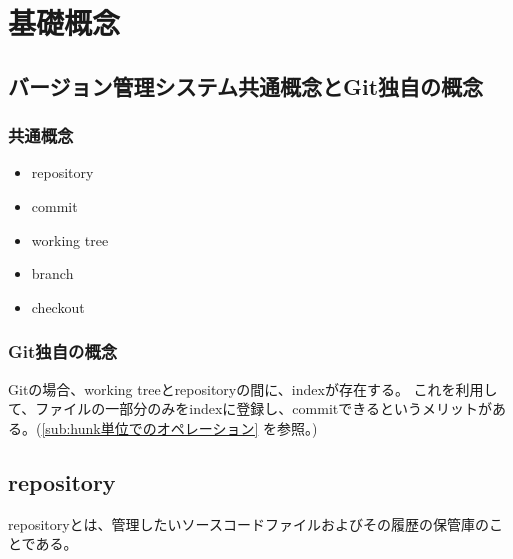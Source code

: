 \documentclass[11pt,a4paper,openany,dvipdfmx]{jsarticle}
\begin{document}
\section{基礎概念} %
\label{sec:基礎概念}


\subsection{バージョン管理システム共通概念とGit独自の概念} %
\label{sub:バージョン管理システム共通概念とGit独自の概念}

\subsubsection{共通概念} %
\label{ssub:共通概念}

\begin{itemize}
  \item repository
  \item commit
  \item working tree
  \item branch
  \item checkout
\end{itemize}

\subsubsection{Git独自の概念} %
\label{ssub:git独自の概念}

Gitの場合、working treeとrepositoryの間に、indexが存在する。
これを利用して、ファイルの一部分のみをindexに登録し、commitできるというメリットがある。(\ref{sub:hunk単位でのオペレーション} を参照。)


\subsection{repository} %
\label{sub:repository}


\begin{tcolorbox}[
title=repositoryについて, fonttitle=\bfseries]
repositoryとは、管理したいソースコードファイルおよびその履歴の保管庫のことである。
\end{tcolorbox}
\end{document}

